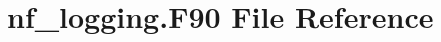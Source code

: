 \hypertarget{nf__logging_8F90}{}\section{nf\+\_\+logging.\+F90 File Reference}
\label{nf__logging_8F90}
